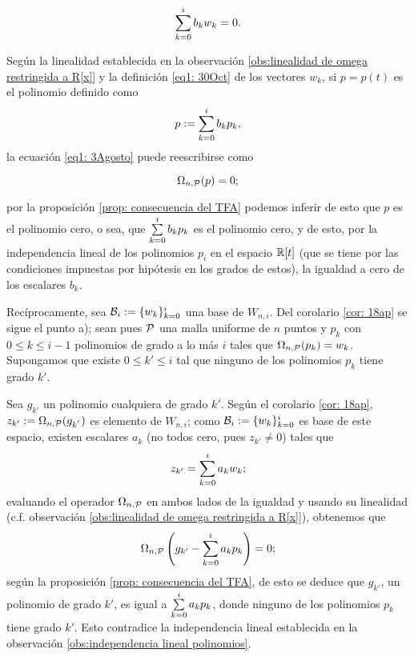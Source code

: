 \begin{equation} \label{eq1: 3Agosto}
\sum\limits_{k=0}^{i}b_{k}w_{k}=0.
\end{equation}

\noindent 
Según la linealidad establecida en la observación
\ref{obs:linealidad de omega restringida a R[x]}
y la definición \eqref{eq1: 30Oct} de los vectores $w_{k}$,
si $p=p(t)$ es el polinomio
definido como
\begin{equation}
\label{eq2: 30Oct}
p:=\sum\limits_{k=0}^{i}b_{k}p_{k},
\end{equation}
la ecuación \eqref{eq1: 3Agosto} puede reescribirse como

\begin{equation} \label{eq2: 3Agosto}
\Omega_{n , \mathcal{P}} (p) = 0;
\end{equation}

\noindent
por la proposición \ref{prop: consecuencia del TFA}
podemos inferir de esto que $p$ es el polinomio cero,  
o sea, que
$\sum\limits_{k=0}^{i}b_{k}p_{k}$ es el polinomio cero,
y de esto, por la
independencia lineal de los polinomios $p_{i}$
en el espacio $\mathbb{R}[t]$ (que se tiene por las condiciones
impuestas por hipótesis en los grados de estos), la
igualdad a cero de los escalares $b_{k}$. 

Recíprocamente, sea $\mathcal{B}_{i} := \{ w_{k} \}_{k=0}^{i}$
una base de $W_{n,i}$. Del corolario 
\ref{cor: 18ap} se sigue el punto a);
sean pues $\mathcal{P}$ una malla uniforme
de $n$ puntos
y $p_{k}$ con $0 \leq k \leq i-1$ polinomios de grado
a lo más $i$ tales que 
$\Omega_{n, \mathcal{P}}(p_{k})=w_{k}$.
Supongamos que existe $0 \leq k' \leq i$
tal que ninguno de los polinomios $p_{k}$
tiene grado $k'$.

Sea $g_{k'}$ un polinomio cualquiera de grado $k'$.
Según el corolario \ref{cor: 18ap}, 
$z_{k'}:= \Omega_{n, \mathcal{P}}(g_{k^{'}})$ es elemento
de $W_{n,i}$; como $\mathcal{B}_{i} := \{ w_{k} \}_{k=0}^{i}$
es base de este espacio, existen escalares
$a_{k}$ (no todos cero, pues
$z_{k'} \neq 0$) tales que 
\[
z_{k'} = \sum\limits_{k=0}^{i}a_{k} w_{k};
\]
evaluando el operador $\Omega_{n, \mathcal{P}}$ en ambos
lados de la igualdad y usando su linealidad
(c.f. observación \ref{obs:linealidad de omega restringida a R[x]}), 
obtenemos que 
\[
\Omega_{n, \mathcal{P}}
\left( g_{k'} - \sum\limits_{k=0}^{i}a_{k}p_{k}
\right) = 0;
\]
según la proposición
\ref{prop: consecuencia del TFA}, de esto se deduce que 
$g_{k'}$, un polinomio de grado $k'$, es 
igual a $\sum\limits_{k=0}^{i}a_{k}p_{k}$, donde ninguno de los 
polinomios $p_{k}$ tiene grado $k'$.
Esto contradice la independencia lineal 
establecida en la observación 
\ref{obs:independencia lineal polinomios}.
\QEDB
\vspace{0.2cm}


